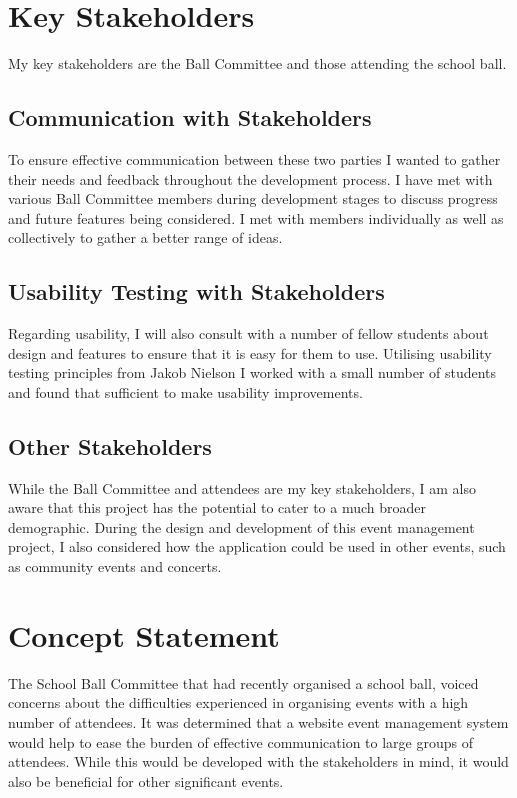 \documentclass[a4paper,oneside,12pt]{report}
\begin{document}
	\section{Key Stakeholders}
	My key stakeholders are the Ball Committee and those attending the school ball. 

	\subsection{Communication with Stakeholders}	
	To ensure effective communication between these two parties I wanted to gather their needs and feedback throughout the development process. I have met with various Ball Committee members during development stages to discuss progress and future features being considered. I met with members individually as well as collectively to gather a better range of ideas.
	
	\subsection{Usability Testing with Stakeholders}
	Regarding usability, I will also consult with a number of fellow students about design and features to ensure that it is easy for them to use. Utilising usability testing principles from Jakob Nielson  I worked with a small number of students and found that sufficient to make usability improvements.
	
	\subsection{Other Stakeholders}
	While the Ball Committee and attendees are my key stakeholders, I am also aware that this project has the potential to cater to a much broader demographic. During the design and development of this event management project, I also considered how the application could be used in other events, such as community events and concerts.

	\section{Concept Statement}
	The School Ball Committee that had recently organised a school ball, voiced concerns about the difficulties experienced in organising events with a high number of attendees. It was determined that a website event management system would help to ease the burden of effective communication to large groups of attendees. While this would be developed with the stakeholders in mind, it would also be beneficial for other significant events.
\end{document}
